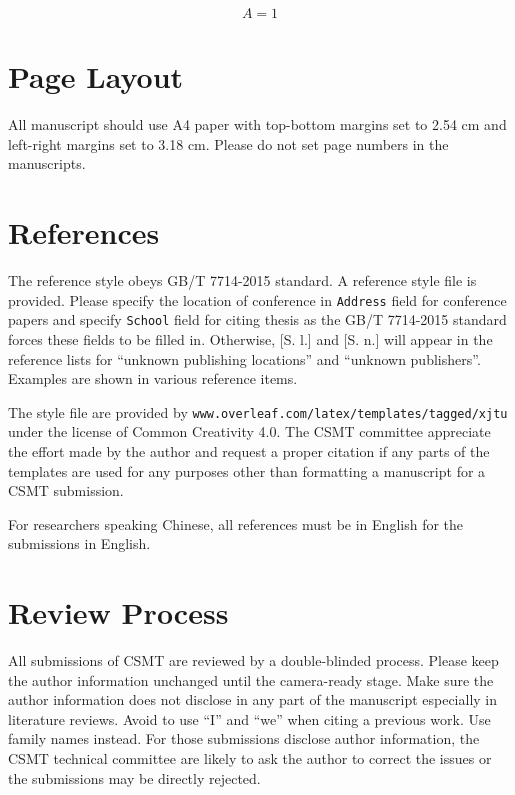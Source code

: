 \documentclass[UTF8,a4paper]{article}
\begin{document}
\begin{equation}
	A=1
	\label{eq:1}
\end{equation}

\section{Page Layout}

All manuscript should use A4 paper with top-bottom margins set to 2.54 cm and left-right margins set to 3.18 cm. Please do not set page numbers in the manuscripts.

\section{References}

The reference style obeys GB/T 7714-2015 standard. A reference style file is provided. Please specify the location of conference in \texttt{Address} field for conference papers and specify \texttt{School} field for citing thesis as the GB/T 7714-2015 standard forces these fields to be filled in. Otherwise, [S. l.] and [S. n.] will appear in the reference lists for ``unknown publishing locations'' and ``unknown publishers''. Examples are shown in various reference items. \cite{eArticle, eConference, ebook}

The style file are provided by \texttt{www.overleaf.com/latex/templates/tagged/xjtu} under the license of Common Creativity 4.0. The CSMT committee appreciate the effort made by the author and request a proper citation if any parts of the templates are used for any purposes other than formatting a manuscript for a CSMT submission.

For researchers speaking Chinese, all references must be in English for the submissions in English.

\section{Review Process}

All submissions of CSMT are reviewed by a double-blinded process. Please keep the author information unchanged until the camera-ready stage. Make sure the author information does not disclose in any part of the manuscript especially in literature reviews. Avoid to use ``I'' and ``we'' when citing a previous work. Use family names instead. For those submissions disclose author information, the CSMT technical committee are likely to ask the author to correct the issues or the submissions may be directly rejected.
\end{document}
